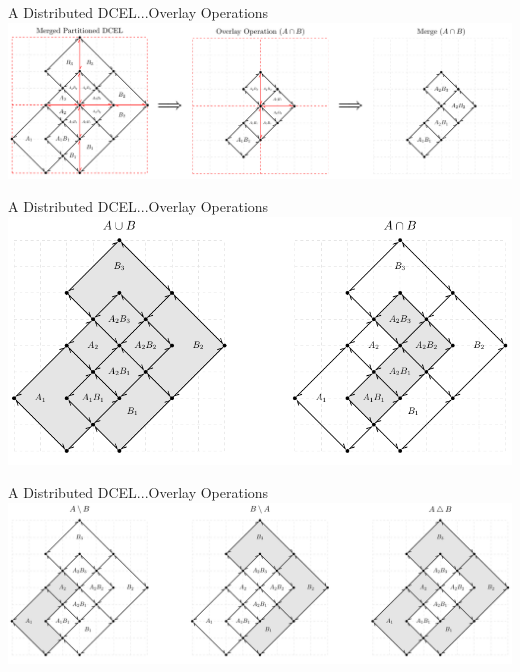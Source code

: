 \documentclass{beamer}
\begin{document}
\begin{frame}{A Distributed DCEL...}{Overlay Operations}
    \centering
	\includegraphics[width=1\textwidth]{figures/03-Overlays1/OverlayParted2}
\end{frame}

\begin{frame}{A Distributed DCEL...}{Overlay Operations}
    \centering
	\includegraphics[width=1\textwidth]{figures/04-Overlays2/OverlayOperations1}
\end{frame}
\begin{frame}{A Distributed DCEL...}{Overlay Operations}
    \centering
	\includegraphics[width=1\textwidth]{figures/04-Overlays2/OverlayOperations2}
\end{frame}
\end{document}
